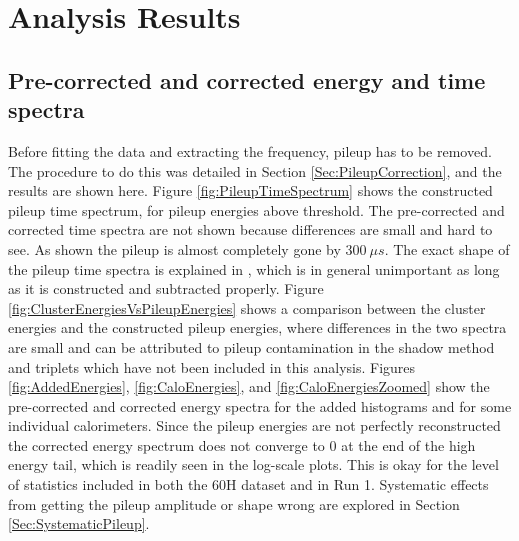 \graphicspath{ {Figures/Pileup/Energies/} {Figures/Pileup/TimeSpectra/} {Figures/Main/} {Figures/ResidualsFFT/} {Figures/FitStartScans/} {Figures/FitEndScans/} {Figures/PerCalo/} }

\chapter{Analysis Results}
\label{Ch:Results}

\section{Pre-corrected and corrected energy and time spectra}

	Before fitting the data and extracting the \gmtwo frequency, pileup has to be removed. The procedure to do this was detailed in Section \ref{Sec:PileupCorrection}, and the results are shown here. Figure \ref{fig:PileupTimeSpectrum} shows the constructed pileup time spectrum, for pileup energies above threshold. The pre-corrected and corrected time spectra are not shown because differences are small and hard to see. As shown the pileup is almost completely gone by $\SI{300}{\mu s}$. The exact shape of the pileup time spectra is explained in , which is in general unimportant as long as it is constructed and subtracted properly. Figure \ref{fig:ClusterEnergiesVsPileupEnergies} shows a comparison between the cluster energies and the constructed pileup energies, where differences in the two spectra are small and can be attributed to pileup contamination in the shadow method and triplets which have not been included in this analysis. Figures \ref{fig:AddedEnergies}, \ref{fig:CaloEnergies}, and \ref{fig:CaloEnergiesZoomed} show the pre-corrected and corrected energy spectra for the added histograms and for some individual calorimeters. Since the pileup energies are not perfectly reconstructed the corrected energy spectrum does not converge to 0 at the end of the high energy tail, which is readily seen in the log-scale plots. This is okay for the level of statistics included in both the 60H dataset and in Run 1. Systematic effects from getting the pileup amplitude or shape wrong are explored in Section \ref{Sec:SystematicPileup}.

